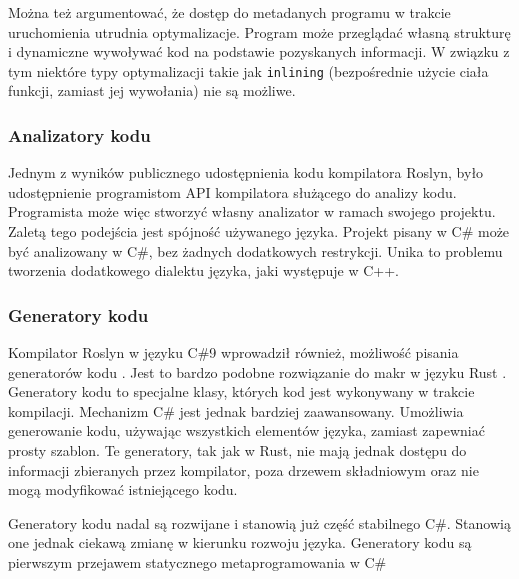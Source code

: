 Można też argumentować, że dostęp do metadanych programu w trakcie uruchomienia utrudnia optymalizacje.
Program może przeglądać własną strukturę i dynamiczne wywoływać kod na podstawie pozyskanych informacji.
W związku z tym niektóre typy optymalizacji takie jak \lstinline{inlining} (bezpośrednie użycie ciała funkcji, zamiast jej wywołania) nie są możliwe.%

\subsubsection{Analizatory kodu}

Jednym z wyników publicznego udostępnienia kodu kompilatora Roslyn\cite{roslyn}, było udostępnienie programistom API kompilatora służącego do analizy kodu.
Programista może więc stworzyć własny analizator w ramach swojego projektu.
Zaletą tego podejścia  jest spójność używanego języka.
Projekt pisany w C\# może być analizowany w C\#, bez żadnych dodatkowych restrykcji.
Unika to problemu tworzenia dodatkowego dialektu języka, jaki występuje w C++.

\subsubsection{Generatory kodu}

Kompilator Roslyn w języku C\#9 wprowadził również, możliwość pisania generatorów kodu \cite{csharp:source_generators,roslyn}.
Jest to bardzo podobne rozwiązanie do makr w języku Rust \cite{rust, klabnik2019rust}. Generatory kodu to specjalne klasy, których kod jest wykonywany w trakcie kompilacji. 
Mechanizm C\# jest jednak bardziej zaawansowany.
Umożliwia generowanie kodu, używając wszystkich elementów języka, zamiast zapewniać prosty szablon.
Te generatory, tak jak w Rust, nie mają jednak dostępu do informacji zbieranych przez kompilator, poza drzewem składniowym oraz nie mogą modyfikować istniejącego kodu.

Generatory kodu nadal są rozwijane i stanowią już część stabilnego C\#.
Stanowią one jednak ciekawą zmianę w kierunku rozwoju języka. 
Generatory kodu są pierwszym przejawem statycznego metaprogramowania w C\#

